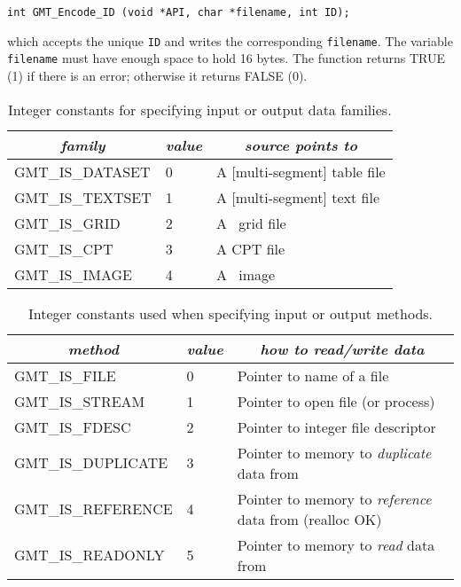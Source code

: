 \documentclass[11pt]{report}
\begin{document}
\begin{verbatim}
int GMT_Encode_ID (void *API, char *filename, int ID);
\end{verbatim}
which accepts the unique \texttt{ID} and writes the corresponding \texttt{filename}.
The variable \texttt{filename} must have enough space to hold 16 bytes.
The function returns TRUE (1) if there is an error; otherwise it returns FALSE (0).

\begin{table}[h]
\small
\centering
\begin{tabular}{|l|l|l|} \hline
\multicolumn{1}{|c|}{\emph{family}} & \multicolumn{1}{c|}{\emph{value}} & \multicolumn{1}{c|}{\emph{source points to}} \\ \hline
GMT\_IS\_DATASET	&	0	&	A [multi-segment] table file \\ \hline
GMT\_IS\_TEXTSET	&	1	&	A [multi-segment] text file \\ \hline
GMT\_IS\_GRID		&	2	&	A \GMT\ grid file \\ \hline
GMT\_IS\_CPT		&	3	&	A CPT file \\ \hline
GMT\_IS\_IMAGE		&	4	&	A \GMT\ image \\ \hline
\end{tabular}
\caption{Integer constants for specifying input or output data families.}
\label{tbl:family}
\end{table}


\begin{table}[h]
\small
\centering
\begin{tabular}{|l|l|l|} \hline
\multicolumn{1}{|c|}{\emph{method}} & \multicolumn{1}{c|}{\emph{value}} & \multicolumn{1}{c|}{\emph{how to read/write data}} \\ \hline
GMT\_IS\_FILE		&	0	&       Pointer to name of a file \\ \hline
GMT\_IS\_STREAM		&	1	&       Pointer to open file (or process)  \\ \hline
GMT\_IS\_FDESC		&	2	&       Pointer to integer file descriptor \\ \hline
GMT\_IS\_DUPLICATE	&	3	&       Pointer to memory to \emph{duplicate} data from \\ \hline
GMT\_IS\_REFERENCE	&	4	&       Pointer to memory to \emph{reference} data from (realloc OK) \\ \hline
GMT\_IS\_READONLY	&	5	&       Pointer to memory to \emph{read} data from \\ \hline
\end{tabular}
\caption{Integer constants used when specifying input or output methods.}
\label{tbl:methods}
\end{table}
\end{document}
